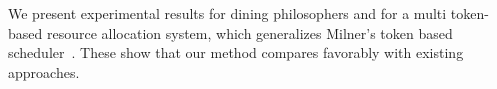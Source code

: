 We present experimental results for dining philosophers and for a multi token-based resource allocation system, which generalizes Milner's token based
scheduler~\cite{milner}.  These show that our method compares favorably with existing approaches.








